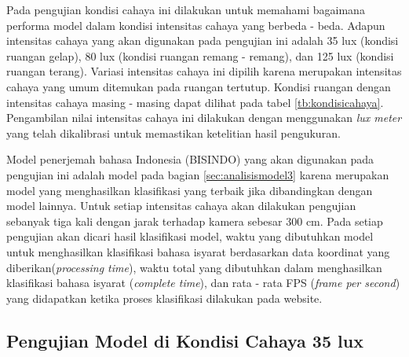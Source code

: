 Pada pengujian kondisi cahaya ini dilakukan untuk memahami bagaimana performa model dalam kondisi intensitas cahaya  yang berbeda - beda. Adapun intensitas cahaya yang akan digunakan pada pengujian ini adalah 35 lux (kondisi ruangan gelap), 80 lux (kondisi ruangan remang - remang), dan 125 lux (kondisi ruangan terang). Variasi intensitas cahaya ini dipilih karena merupakan intensitas cahaya yang umum ditemukan pada ruangan tertutup. Kondisi ruangan dengan intensitas cahaya masing - masing dapat dilihat pada tabel \ref{tb:kondisicahaya}. Pengambilan nilai intensitas cahaya ini dilakukan dengan menggunakan \emph{lux meter} yang telah dikalibrasi untuk memastikan ketelitian hasil pengukuran.

Model penerjemah bahasa Indonesia (BISINDO) yang akan digunakan pada pengujian ini adalah model pada bagian \ref{sec:analisismodel3} karena merupakan model yang menghasilkan klasifikasi yang terbaik jika dibandingkan dengan model lainnya. Untuk setiap intensitas cahaya akan dilakukan pengujian sebanyak tiga kali dengan jarak terhadap kamera sebesar 300 cm. Pada setiap pengujian akan dicari hasil klasifikasi model, waktu yang dibutuhkan model untuk menghasilkan klasifikasi bahasa isyarat berdasarkan data koordinat yang diberikan(\emph{processing time}), waktu total yang dibutuhkan dalam menghasilkan klasifikasi bahasa isyarat (\emph{complete time}), dan rata - rata FPS (\emph{frame per second}) yang didapatkan ketika proses klasifikasi dilakukan pada website.  

\subsection{Pengujian Model di Kondisi Cahaya 35 lux}
\label{sec:analisiscahaya1}

